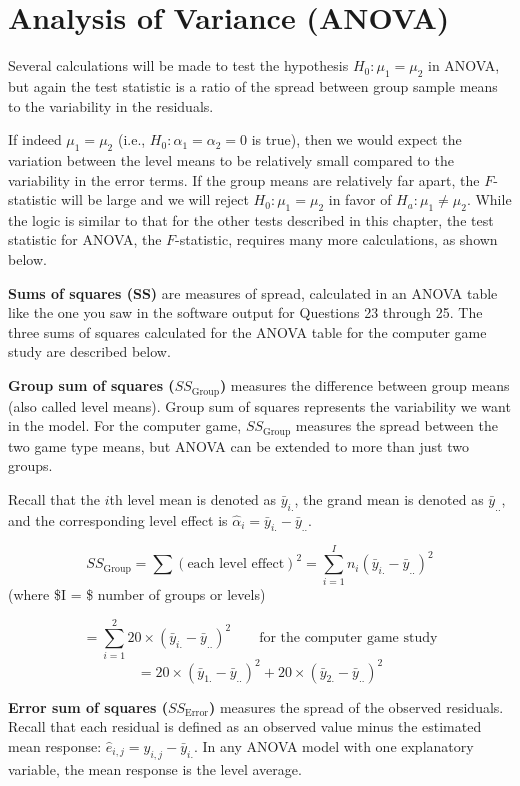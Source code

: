 \documentclass[
]{report}
\begin{document}
\section*{Analysis of Variance (ANOVA)}\label{analysis-of-variance-anova}

Several calculations will be made to test the hypothesis \(H_0\!:\! \mu_1 = \mu_2\) in ANOVA, but again the test statistic is a ratio of the spread between group sample means to the variability in the residuals.

If indeed \(\mu_1 = \mu_2\) (i.e., \(H_0\!:\! \alpha_1 = \alpha_2 = 0\) is true), then we would expect the variation between the level means to be relatively small compared to the variability in the error terms. If the group means are relatively far apart, the \(F\)-statistic will be large and we will reject \(H_0\!:\! \mu_1 = \mu_2\) in favor of \(H_a\!:\! \mu_1 \ne \mu_2\). While the logic is similar to that for the other tests described in this chapter, the test statistic for ANOVA, the \(F\)-statistic, requires many more calculations, as shown below.

\textbf{Sums of squares (SS)} are measures of spread, calculated in an ANOVA table like the one you saw in the software output for Questions 23 through 25. The three sums of squares calculated for the ANOVA table for the computer game study are described below.

\textbf{Group sum of squares (\(SS_{\text{Group}}\))} measures the difference between group means (also called level means). Group sum of squares represents the variability we want in the model. For the computer game, \(SS_{\text{Group}}\) measures the spread between the two game type means, but ANOVA can be extended to more than just two groups.

Recall that the \(i\)th level mean is denoted as \(\bar{y}_{i.}\), the grand mean is denoted as \(\bar{y}_{..}\), and the corresponding level effect is \(\hat{\alpha}_i = \bar{y}_{i.} - \bar{y}_{..}\).

\[
SS_{\text{Group}} = \sum (\text{each level effect})^2 = \sum_{i=1}^{I} n_i (\bar{y}_{i.} - \bar{y}_{..})^2
\]
(where \$I = \$ number of groups or levels)

\[
= \sum_{i=1}^{2} 20 \times (\bar{y}_{i.} - \bar{y}_{..})^2 \qquad \text{for the computer game study}
\]
\[
= 20 \times (\bar{y}_{1.} - \bar{y}_{..})^2 + 20 \times (\bar{y}_{2.} - \bar{y}_{..})^2
\]

\textbf{Error sum of squares (\(SS_{\text{Error}}\))} measures the spread of the observed residuals. Recall that each residual is defined as an observed value minus the estimated mean response: \(\hat{e}_{i,j} = y_{i,j} - \bar{y}_{i.}\). In any ANOVA model with one explanatory variable, the mean response is the level average.
\end{document}
